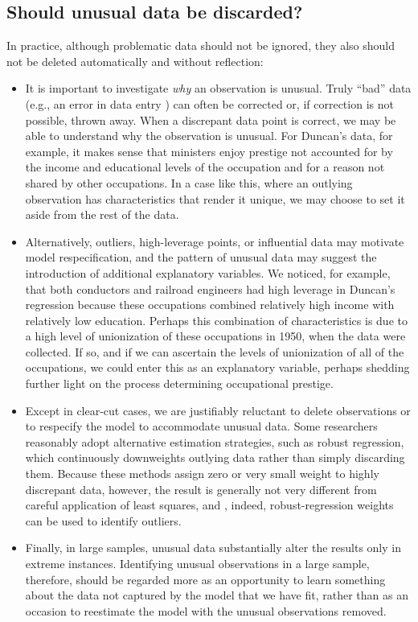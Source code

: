\subsection*{Should unusual data be discarded?}
In practice, although problematic data should not be ignored, they also should not be deleted automatically and without reflection:
\begin{itemize}
  \item It is important to investigate {\it why} an observation is unusual.  Truly ``bad'' data (e.g., an error in data entry ) can often be corrected or, if correction is not possible, thrown away.
  When a discrepant data point is correct, we may be able to understand why the observation is unusual.  
  For Duncan's data, for example, it makes sense that ministers enjoy prestige not accounted for by the income and educational levels of the occupation and for a reason not shared by other occupations.
  In a case like this, where an outlying observation has characteristics that render it unique, we may choose to set it aside from the rest of the data.
  \item Alternatively, outliers, high-leverage points, or influential data may motivate model respecification, and the pattern of unusual data may suggest the introduction of additional explanatory variables.
  We noticed, for example, that both conductors and railroad engineers had high leverage in Duncan's regression because these occupations combined relatively high income with relatively low education.
  Perhaps this combination of characteristics is due to a high level of unionization of these occupations in 1950, when the data were collected.
  If so, and if we can ascertain the levels of unionization of all of the occupations, we could enter this as an explanatory variable, perhaps shedding further light on the process determining occupational prestige.
  \item Except in clear-cut cases, we are justifiably reluctant to delete observations or to respecify the model to accommodate unusual data.
  Some researchers reasonably adopt alternative estimation strategies, such as robust regression, which continuously downweights outlying data rather than simply discarding them.
  Because these methods assign zero or very small weight to highly discrepant data, however, the result is generally not very different from careful application of least squares, and , indeed, robust-regression weights can be used to identify outliers.
  \item Finally, in large samples, unusual data substantially alter the results only in extreme instances.
  Identifying unusual observations in a large sample, therefore, should be regarded more as an opportunity to learn something about the data not captured by the model that we have fit, rather than as an occasion to reestimate the model with the unusual observations removed.
  
\end{itemize}



